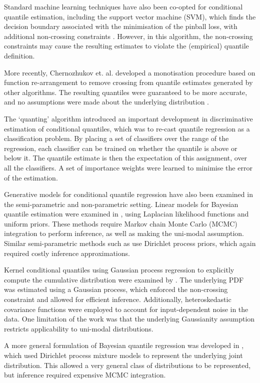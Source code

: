 \documentclass[twoside]{article} \usepackage{aistats2017}
\begin{document}
	Standard machine learning techniques have also been co-opted for conditional quantile estimation, including the support vector machine (SVM), which finds the decision boundary associated with the minimisation of the pinball loss, with additional non-crossing constraints \citep{Takeuchi2006}. However, in this algorithm, the non-crossing constraints may cause the resulting estimates to violate the (empirical) quantile definition.

	More recently, Chernozhukov et. al. developed a monotisation procedure based on function re-arrangement to remove crossing from quantile estimates generated by other algorithms. The resulting quantiles were guaranteed to be more accurate, and no assumptions were made about the underlying distribution \citep{Chernozhukov2010}.

	The `quanting' algorithm \citep{Langford2006} introduced an important development in discriminative estimation of conditional quantiles, which was to re-cast quantile regression as a classification problem. By placing a set of classifiers over the range of the regression, each classifier can be trained on whether the quantile is above or below it. The quantile estimate is then the expectation of this assignment, over all the classifiers.  A set of importance weights were learned to minimise the error of the estimation.

	Generative models for conditional quantile regression have also been examined in the semi-parametric and non-parametric setting. Linear models for Bayesian quantile estimation were examined in \cite{Yu2001}, using Laplacian likelihood functions and uniform priors. These methods require Markov chain Monte Carlo (MCMC) integration to perform inference, as well as making the uni-modal assumption. Similar semi-parametric methods such as \cite{Hjort2006, Hjort2009} use Dirichlet process priors, which again required costly inference approximations.

	Kernel conditional quantiles using Gaussian process regression to explicitly compute the cumulative distribution were examined by \cite{Quadrianto2009}. The underlying PDF was estimated using a Gaussian process, which enforced the non-crossing constraint and allowed for efficient inference. Additionally, heteroskedastic covariance functions were employed to account for input-dependent noise in the data. One limitation of the work was that the underlying Gaussianity assumption restricts applicability to uni-modal distributions.

	A more general formulation of Bayesian quantile regression was developed in \cite{Taddy2010}, which used Dirichlet process mixture models to represent the underlying joint distribution. This allowed a very general class of distributions to be represented, but inference required expensive MCMC integration.
\end{document}
